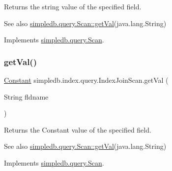 Returns the string value of the specified field. \begin{DoxySeeAlso}{See also}
\hyperlink{interfacesimpledb_1_1query_1_1Scan_aca80bca2857c983a88834bf6c01ee5ca}{simpledb.\+query.\+Scan\+::get\+Val}(java.\+lang.\+String) 
\end{DoxySeeAlso}


Implements \hyperlink{interfacesimpledb_1_1query_1_1Scan_a922e219fee53ecfa6163525f9e3ef222}{simpledb.\+query.\+Scan}.

\mbox{\label{classsimpledb_1_1index_1_1query_1_1IndexJoinScan_a8a554a0f56fcfe981c302e4929e2c211}} 
\subsubsection{\texorpdfstring{get\+Val()}{getVal()}}
{\footnotesize\ttfamily \hyperlink{classsimpledb_1_1query_1_1Constant}{Constant} simpledb.\+index.\+query.\+Index\+Join\+Scan.\+get\+Val (\begin{DoxyParamCaption}\item[{String}]{fldname }\end{DoxyParamCaption})\hspace{0.3cm}{\ttfamily [inline]}}

Returns the Constant value of the specified field. \begin{DoxySeeAlso}{See also}
\hyperlink{interfacesimpledb_1_1query_1_1Scan_aca80bca2857c983a88834bf6c01ee5ca}{simpledb.\+query.\+Scan\+::get\+Val}(java.\+lang.\+String) 
\end{DoxySeeAlso}


Implements \hyperlink{interfacesimpledb_1_1query_1_1Scan_aca80bca2857c983a88834bf6c01ee5ca}{simpledb.\+query.\+Scan}.

\mbox{\label{classsimpledb_1_1index_1_1query_1_1IndexJoinScan_a2079804951f64581efd8cc1ef6af297b}} 
